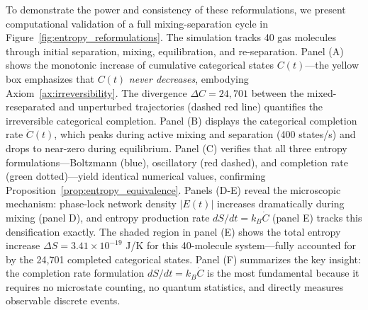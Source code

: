 \documentclass[twocolumn,superscriptaddress,prb,10pt]{revtex4-2}
\theoremstyle{definition}
\theoremstyle{remark}
\begin{document}
To demonstrate the power and consistency of these reformulations, we present computational validation of a full mixing-separation cycle in Figure~\ref{fig:entropy_reformulations}. The simulation tracks 40 gas molecules through initial separation, mixing, equilibration, and re-separation. Panel (A) shows the monotonic increase of cumulative categorical states $C(t)$—the yellow box emphasizes that $C(t)$ \emph{never decreases}, embodying Axiom~\ref{ax:irreversibility}. The divergence $\Delta C = 24{,}701$ between the mixed-reseparated and unperturbed trajectories (dashed red line) quantifies the irreversible categorical completion. Panel (B) displays the categorical completion rate $\dot{C}(t)$, which peaks during active mixing and separation (400 states/s) and drops to near-zero during equilibrium. Panel (C) verifies that all three entropy formulations—Boltzmann (blue), oscillatory (red dashed), and completion rate (green dotted)—yield identical numerical values, confirming Proposition~\ref{prop:entropy_equivalence}. Panels (D-E) reveal the microscopic mechanism: phase-lock network density $|E(t)|$ increases dramatically during mixing (panel D), and entropy production rate $dS/dt = k_B \dot{C}$ (panel E) tracks this densification exactly. The shaded region in panel (E) shows the total entropy increase $\Delta S = 3.41 \times 10^{-19}$ J/K for this 40-molecule system—fully accounted for by the 24,701 completed categorical states. Panel (F) summarizes the key insight: the completion rate formulation $dS/dt = k_B \dot{C}$ is the most fundamental because it requires no microstate counting, no quantum statistics, and directly measures observable discrete events.
\end{document}
